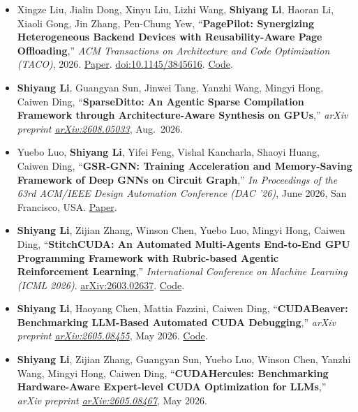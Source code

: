 \documentclass[a4paper,10pt]{article}
\newcommand{\faChevronRight}{\textbullet}
\begin{document}
\begin{itemize}[leftmargin=1.2em, label=\textcolor{sectioncolor}{\small\faChevronRight}, itemsep=3pt]

  \item Xingze Liu, Jialin Dong, Xinyu Liu, Lizhi Wang, \textbf{Shiyang Li}, Haoran Li, Xiaoli Gong, Jin Zhang, Pen-Chung Yew, ``\textbf{PagePilot: Synergizing Heterogeneous Backend Devices with Reusability-Aware Page Offloading},'' \textit{ACM Transactions on Architecture and Code Optimization (TACO)}, 2026. \href{https://NKU-Yang.github.io/files/pagepilot.pdf}{Paper}. \href{https://doi.org/10.1145/3845616}{doi:10.1145/3845616}. \href{https://github.com/NKU-EmbeddedSystem/pagepilot}{Code}.

  \item \textbf{Shiyang Li}, Guangyan Sun, Jinwei Tang, Yanzhi Wang, Mingyi Hong, Caiwen Ding, ``\textbf{SparseDitto: An Agentic Sparse Compilation Framework through Architecture-Aware Synthesis on GPUs},'' \textit{arXiv preprint \href{https://arxiv.org/abs/2608.05033}{arXiv:2608.05033}}, Aug.\ 2026.

  \item Yuebo Luo, \textbf{Shiyang Li}, Yifei Feng, Vishal Kancharla, Shaoyi Huang, Caiwen Ding, ``\textbf{GSR-GNN: Training Acceleration and Memory-Saving Framework of Deep GNNs on Circuit Graph},'' \textit{In Proceedings of the 63rd ACM/IEEE Design Automation Conference (DAC '26)}, June 2026, San Francisco, USA. \href{https://NKU-Yang.github.io/files/GSR-GNN.pdf}{Paper}.

  \item \textbf{Shiyang Li}, Zijian Zhang, Winson Chen, Yuebo Luo, Mingyi Hong, Caiwen Ding, ``\textbf{StitchCUDA: An Automated Multi-Agents End-to-End GPU Programming Framework with Rubric-based Agentic Reinforcement Learning},'' \textit{International Conference on Machine Learning (ICML 2026)}. \href{https://arxiv.org/abs/2603.02637}{arXiv:2603.02637}. \href{https://github.com/NKU-Yang/StitchCUDA}{Code}.

  \item \textbf{Shiyang Li}, Haoyang Chen, Mattia Fazzini, Caiwen Ding, ``\textbf{CUDABeaver: Benchmarking LLM-Based Automated CUDA Debugging},'' \textit{arXiv preprint \href{https://arxiv.org/abs/2605.08455}{arXiv:2605.08455}}, May 2026. \href{https://github.com/HaoyangChen23/CUDABeaver}{Code}.

  \item \textbf{Shiyang Li}, Zijian Zhang, Guangyan Sun, Yuebo Luo, Winson Chen, Yanzhi Wang, Mingyi Hong, Caiwen Ding, ``\textbf{CUDAHercules: Benchmarking Hardware-Aware Expert-level CUDA Optimization for LLMs},'' \textit{arXiv preprint \href{https://arxiv.org/abs/2605.08467}{arXiv:2605.08467}}, May 2026.


\end{itemize}
\end{document}
